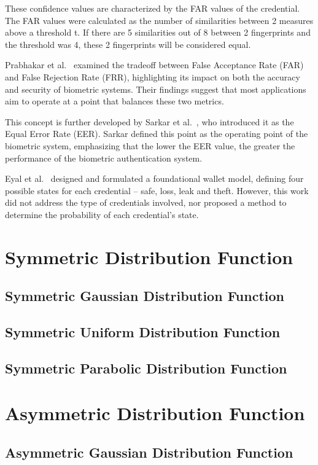 \documentclass{article}
\begin{document}
These confidence values are characterized by the FAR values of the credential. The FAR values were calculated as the number of similarities between 2 measures above a threshold t. If there are 5 similarities out of 8 between 2 fingerprints and the threshold was 4, these 2 fingerprints will be considered equal.

Prabhakar et al.~\cite{prabhakar2003} examined the tradeoff between False Acceptance Rate (FAR) and False Rejection Rate (FRR), highlighting its impact on both the accuracy and security of biometric systems. Their findings suggest that most applications aim to operate at a point that balances these two metrics.

This concept is further developed by Sarkar et al.~\cite{sarkar2020}, who introduced it as the Equal Error Rate (EER). Sarkar defined this point as the operating point of the biometric system, emphasizing that the lower the EER value, the greater the performance of the biometric authentication system.

Eyal et al.~\cite{Eyal2021} designed and formulated a foundational wallet model, defining four possible states for each credential – safe, loss, leak and theft. However, this work did not address the type of credentials involved, nor proposed a method to determine the probability of each credential’s state.
\section{Symmetric Distribution Function}
\subsection{Symmetric Gaussian Distribution Function}
\subsection{Symmetric Uniform Distribution Function}
\subsection{Symmetric Parabolic Distribution Function}
\section{Asymmetric Distribution Function}
\subsection{Asymmetric Gaussian Distribution Function}
\end{document}
